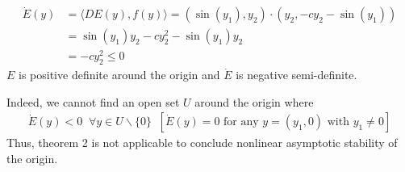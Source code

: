 \begin{solution}[3.7]
\begin{align}
	\dot{E}(y) &= \langle DE(y),f(y) \rangle = (\sin(y_1),y_2) \cdot (y_2, -cy_2 - \sin(y_1)) \\
	&= \sin(y_1)y_2 - cy_2^2 -\sin(y_1)y_2 \\
	&= -cy_2^2 \leq 0
\end{align}
$E$ is positive definite around the origin and $\dot{E}$ is negative semi-definite.

Indeed, we cannot find an open set $U$ around the origin where
\begin{align}
	\dot{E}(y)<0 \;\; \forall y \in U\backslash \{0\} \;\; [\dot{E}(y)=0 \text{ for any } y = (y_1,0) \text{ with } y_1 \neq 0]
\end{align}
Thus, theorem 2 is not applicable to conclude nonlinear asymptotic stability of the origin.
\end{solution}

